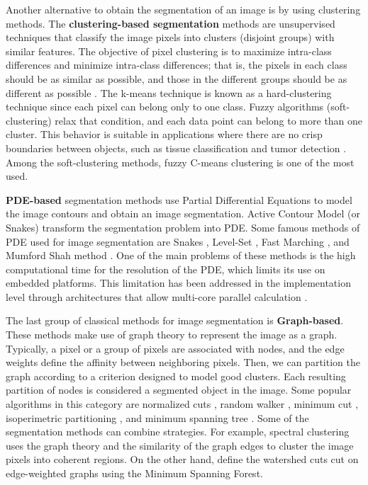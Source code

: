 Another alternative to obtain the segmentation of an image is by using clustering methods. The \textbf{clustering-based segmentation} methods are unsupervised techniques that classify the image pixels into clusters (disjoint groups) with similar features. The objective of pixel clustering is to maximize intra-class differences and minimize intra-class differences; that is, the pixels in each class should be as similar as possible, and those in the different groups should be as different as possible \citep{Steinley:BJMSP:2006}. The k-means technique is known as a hard-clustering technique since each pixel can belong only to one class. Fuzzy algorithms (soft-clustering) relax that condition, and each data point can belong to more than one cluster. This behavior is suitable in applications where there are no crisp boundaries between objects, such as tissue classification \citep{Caldairou.Passat.ea:PR:2011} and tumor detection \citep{Preetha.Suresh:CCT:2014}. Among the soft-clustering methods, fuzzy C-means clustering \citep{Dunn:JC:1973} is one of the most used.

\textbf{PDE-based} segmentation methods use Partial Differential Equations to model the image contours and obtain an image segmentation.  Active Contour Model (or Snakes) transform the segmentation problem into
PDE. Some famous methods of PDE used for image
segmentation are Snakes \citep{Kass.Witkin.ea:JCV:1988}, Level-Set \citep{Osher.Sethian:JCP:1988}, Fast Marching \citep{Forcadel.LeGuyader.ea:NA:2008}, and Mumford Shah method \citep{Mumford.Shah:CPAM:1989}. One of the main problems of these methods is the high computational time for the resolution of the PDE, which limits its use on embedded platforms. This limitation has been addressed in the implementation level through architectures that allow multi-core parallel calculation \citep{Dejnozkova.Dokladal:ICVIE:2003, Dejnozkova.Dokladal:ICASSP:2004}.

The last group of classical methods for image segmentation is \textbf{Graph-based}. These methods make use of graph theory to represent the image as a graph.  Typically, a pixel or a group of pixels are associated with nodes, and the edge weights define the affinity between neighboring pixels. Then, we can partition the graph according to a criterion designed to model good clusters. Each resulting partition of nodes is considered a segmented object in the image. Some popular algorithms in this category are normalized cuts \citep{JianboShi.Malik:PAMI:2000}, random walker \citep{Grady:PAMI:2006}, minimum cut \citep{Wu.Leahy:PAMI:1993}, isoperimetric partitioning \citep{Grady.Schwartz:PAMI:2006}, and minimum spanning tree \citep{Zahn:TC:1971}. Some of the segmentation methods can combine strategies. For example, spectral clustering \citep{Ng.Jordan.ea:NIPS:2001} uses the graph theory and the similarity of the graph edges to cluster the image pixels into coherent regions. On the other hand, \citep{Cousty.Bertrand.ea:PAMI:2009} define the watershed cuts cut on edge-weighted graphs using the Minimum Spanning Forest.

